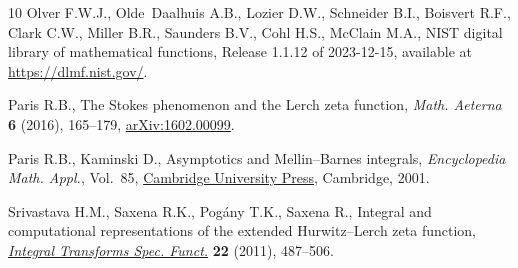 \documentclass[pdftex]{sigma}
\numberwithin{equation}{section}
\begin{document}
\begin{thebibliography}{10}
Olver F.W.J., Olde~Daalhuis A.B., Lozier D.W., Schneider B.I., Boisvert R.F.,
 Clark C.W., Miller B.R., Saunders B.V., Cohl H.S., McClain M.A., NIST digital
 library of mathematical functions, {R}elease 1.1.12 of 2023-12-15, available
 at \url{https://dlmf.nist.gov/}.

Paris R.B., The {S}tokes phenomenon and the {L}erch zeta function,
 \textit{Math. Aeterna} \textbf{6} (2016), 165--179, \href{https://arxiv.org/abs/1602.00099}{arXiv:1602.00099}.

Paris R.B., Kaminski D., Asymptotics and {M}ellin--{B}arnes integrals,
 \textit{Encyclopedia Math. Appl.}, Vol.~85, \href{https://doi.org/10.1017/CBO9780511546662}{Cambridge University Press},
 Cambridge, 2001.

Srivastava H.M., Saxena R.K., Pog\'any T.K., Saxena R., Integral and
 computational representations of the extended {H}urwitz--{L}erch zeta
 function, \href{https://doi.org/10.1080/10652469.2010.530128}{\textit{Integral Transforms Spec. Funct.}} \textbf{22} (2011),
 487--506.

\end{thebibliography}\LastPageEnding
\end{document}
